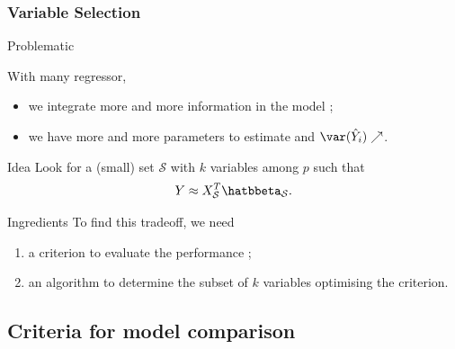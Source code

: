 \documentclass{beamer}\usepackage[]{graphicx}\usepackage[]{color}
\begin{document}
\begin{frame}
  \frametitle{Variable Selection}

  \begin{block}{Problematic}
    
  With many regressor, 
  \begin{itemize}
  \item we integrate more and more information in the model ;
  \item we have more and more parameters to estimate and $\var (\hat{Y}_i)\nearrow$.
  \end{itemize}  
\end{block}

  \vfill
  
  \begin{block}{Idea}
    Look for a (small)  set $\mathcal{S}$ with  $k$ variables
    among $p$ such that
  \begin{equation*}
    Y \approx X_{\mathcal{S}}^T \hatbbeta_{\mathcal{S}}.
  \end{equation*} 
    \end{block}

  \begin{block}{Ingredients}
    To find this tradeoff, we need
    \begin{enumerate}
    \item a \alert{criterion} to evaluate the performance ;
    \item an \alert{algorithm} to determine the subset of $k$ variables optimising the criterion.
    \end{enumerate}
  \end{block}

\end{frame}

\subsection{Criteria for model comparison}
\end{document}

